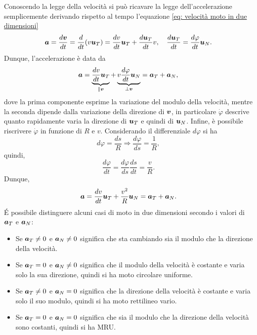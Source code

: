 Conoscendo la legge della velocità si può ricavare la legge dell'accelerazione semplicemente derivando rispetto al tempo l'equazione \eqref{eq: velocità moto in due dimensioni}
\begin{equation}
    \bm{a}=\frac{d\bm{v}}{dt}=\frac{d}{dt}(v\bm{u}_T)=\frac{dv}{dt}\bm{u}_T+\frac{d\bm{u}_T}{dt}v,\quad\frac{d\bm{u}_T}{dt}=\frac{d\varphi}{dt}\bm{u}_N.
\end{equation}
Dunque, l'accelerazione è data da
\begin{equation}
    \bm{a}=\underbrace{\frac{dv}{dt}\bm{u}_T}_{\substack{\parallel \bm{v}}}+\underbrace{v\frac{d\varphi}{dt}\bm{u}_N}_{\substack{\perp \bm{v}}}=\bm{a}_T+\bm{a}_N,
\end{equation}
dove la prima componente esprime la variazione del modulo della velocità, mentre la seconda dipende dalla variazione della direzione di $\bm{v}$, in particolare $\dot{\varphi}$ descrive quanto rapidamente varia la direzione di $\bm{u}_T$ e quindi di $\bm{u}_N$. Infine, è possibile riscrivere $\dot{\varphi}$ in funzione di $R$ e $v$. Considerando il differenziale $d\varphi$ si ha
\begin{equation}
    d\varphi=\frac{ds}{R}\Rightarrow\frac{d\varphi}{ds}=\frac{1}{R},
\end{equation}
quindi,
\begin{equation}
    \frac{d\varphi}{dt}=\frac{d\varphi}{ds}\frac{ds}{dt}=\frac{v}{R}.
\end{equation}
Dunque,
\begin{equation}
    \bm{a}=\frac{dv}{dt}\bm{u}_T+\frac{v^2}{R}\bm{u}_N=\bm{a}_T+\bm{a}_N.
\end{equation}
\'E possibile distinguere alcuni casi di moto in due dimensioni secondo i valori di $\bm{a}_T$ e $\bm{a}_N$:
\begin{itemize}
    \item Se $\bm{a}_T\neq0$ e $\bm{a}_N\neq0$ significa che sta cambiando sia il modulo che la direzione della velocità.
    \item Se $\bm{a}_T=0$ e $\bm{a}_N\neq0$ significa che il modulo della velocità è costante e varia solo la sua direzione, quindi si ha moto circolare uniforme.
    \item Se $\bm{a}_T\neq0$ e $\bm{a}_N=0$ significa che la direzione della velocità è costante e varia solo il suo modulo, quindi si ha moto rettilineo vario.
    \item Se $\bm{a}_T=0$ e $\bm{a}_N=0$ significa che sia il modulo che la direzione della velocità sono costanti, quindi si ha MRU.
\end{itemize}

